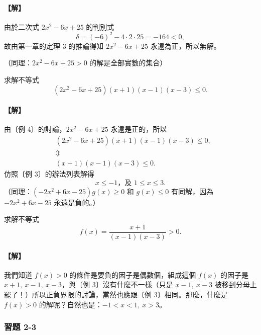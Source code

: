 \paragraph{【解】} 由於二次式 $2x^2-6x+25$ 的判別式
\[
\delta = (-6)^2 - 4\cdot 2\cdot 25 = -164 < 0,
\]
故由第一章的定理 3 的推論得知 $2x^2-6x+25$ 永遠為正，所以無解。

（同理：$2x^2-6x+25>0$ 的解是全部實數的集合）

\begin{example}\label{ex:b2_2-3-5}
求解不等式
\[
(2x^2-6x+25)(x+1)(x-1)(x-3)\le 0.
\]
\end{example}
\paragraph{【解】} 由〔例 4〕的討論，$2x^2-6x+25$ 永遠是正的，所以
\begin{align*}
&(2x^2-6x+25)(x+1)(x-1)(x-3)\le 0, \\
&\Updownarrow \\
&(x+1)(x-1)(x-3)\le 0.
\end{align*}
仿照〔例 3〕的辦法列表解得
\[
x\le -1\text{，及 } 1\le x\le 3.
\]
（同理：$(-2x^2+6x-25)g(x)\ge 0$ 和 $g(x)\le 0$ 有同解，因為 $-2x^2+6x-25$ 永遠是負的。）

\begin{example}\label{ex:b2_2-3-6}
求解不等式
\[
f(x) = \frac{x+1}{(x-1)(x-3)} > 0.
\]
\end{example}
\paragraph{【解】} 我們知道 $f(x)>0$ 的條件是要負的因子是偶數個，組成這個 $f(x)$ 的因子是 $x+1,\ x-1,\ x-3$，與〔例 3〕沒有什麼不一樣（只是 $x-1,\ x-3$ 被移到分母上罷了！）所以正負界限的討論，當然也應跟〔例 3〕相同。那麼，什麼是 $f(x)>0$ 的解呢？自然也是：$-1<x<1,\ x>3$。

\subsubsection*{習題 2-3}

